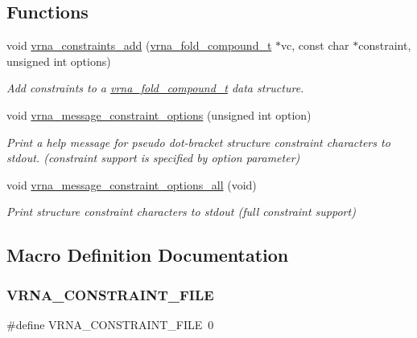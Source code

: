 \subsection*{Functions}
\begin{DoxyCompactItemize}
\item 
void \mbox{\hyperlink{group__constraints_ga35a401f680969a556858a8dd5f1d07cc}{vrna\+\_\+constraints\+\_\+add}} (\mbox{\hyperlink{group__fold__compound_ga1b0cef17fd40466cef5968eaeeff6166}{vrna\+\_\+fold\+\_\+compound\+\_\+t}} $\ast$vc, const char $\ast$constraint, unsigned int options)
\begin{DoxyCompactList}\small\item\em Add constraints to a \mbox{\hyperlink{group__fold__compound_ga1b0cef17fd40466cef5968eaeeff6166}{vrna\+\_\+fold\+\_\+compound\+\_\+t}} data structure. \end{DoxyCompactList}\item 
void \mbox{\hyperlink{group__constraints_gaa1f20b53bf09ac2e6b0dbb13f7d89670}{vrna\+\_\+message\+\_\+constraint\+\_\+options}} (unsigned int option)
\begin{DoxyCompactList}\small\item\em Print a help message for pseudo dot-\/bracket structure constraint characters to stdout. (constraint support is specified by option parameter) \end{DoxyCompactList}\item 
void \mbox{\hyperlink{group__constraints_gaec7e13fa0465c2acc7a621d1aecb709f}{vrna\+\_\+message\+\_\+constraint\+\_\+options\+\_\+all}} (void)
\begin{DoxyCompactList}\small\item\em Print structure constraint characters to stdout (full constraint support) \end{DoxyCompactList}\end{DoxyCompactItemize}


\subsection{Macro Definition Documentation}
\mbox{\label{group__constraints_ga62e0ed0c33002c09423de4e646f85a2b}} 
\subsubsection{\texorpdfstring{VRNA\_CONSTRAINT\_FILE}{VRNA\_CONSTRAINT\_FILE}}
{\footnotesize\ttfamily \#define V\+R\+N\+A\+\_\+\+C\+O\+N\+S\+T\+R\+A\+I\+N\+T\+\_\+\+F\+I\+LE~0}



